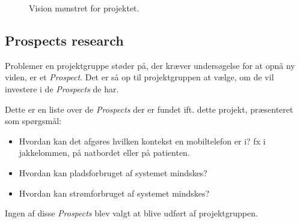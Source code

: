 \begin{figure}[h]
	\centering
	\resizebox{\columnwidth}{!}{
		}
	\caption{Vision mønstret for projektet.}
	\label{fig:visionpattern}
\end{figure}

\subsection{Prospects research}
Problemer en projektgruppe støder på, der kræver undersøgelse for at opnå ny viden, er et \textit{Prospect}.
Det er så op til projektgruppen at vælge, om de vil investere i de \textit{Prospects} de har. \cite[nederst på side 104]{art:essence}

Dette er en liste over de \textit{Prospects} der er fundet ift. dette projekt, præsenteret som spørgsmål:
\begin{itemize}
	\item Hvordan kan det afgøres hvilken kontekst en mobiltelefon er i? fx i jakkelommen, på natbordet eller på patienten.
	\item Hvordan kan pladsforbruget af systemet mindskes?
	\item Hvordan kan strømforbruget af systemet mindskes?
\end{itemize}
Ingen af disse \textit{Prospects} blev valgt at blive udført af projektgruppen.